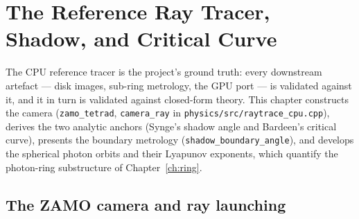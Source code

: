\chapter{The Reference Ray Tracer, Shadow, and Critical Curve}
\label{ch:shadow}

The CPU reference tracer is the project's ground truth: every downstream
artefact — disk images, sub-ring metrology, the GPU port — is validated
against it, and it in turn is validated against closed-form theory. This
chapter constructs the camera (\texttt{zamo\_tetrad},
\texttt{camera\_ray} in \texttt{physics/src/raytrace\_cpu.cpp}), derives
the two analytic anchors (Synge's shadow angle and Bardeen's critical
curve), presents the boundary metrology
(\texttt{shadow\_boundary\_angle}), and develops the spherical photon
orbits and their Lyapunov exponents, which quantify the photon-ring
substructure of Chapter~\ref{ch:ring}.

\section{The ZAMO camera and ray launching}
\label{sec:camera}

